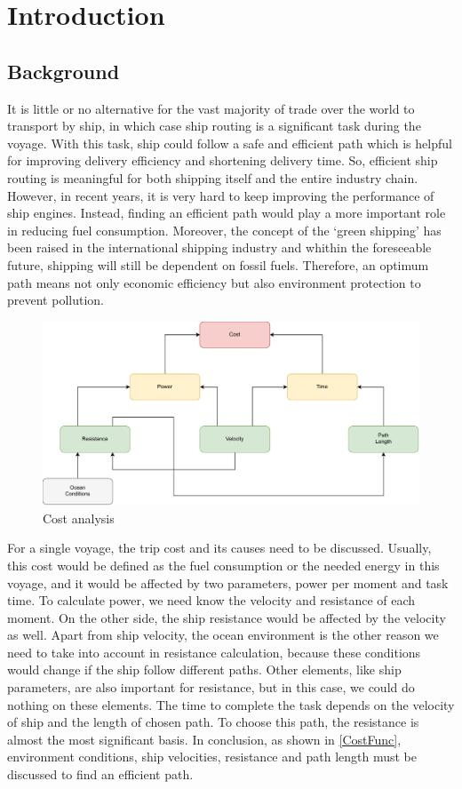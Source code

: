 \chapter{Introduction}
\section{Background}
It is little or no alternative for the vast majority of trade over the world to transport by ship, in which case ship routing is a significant task during the voyage. With this task, ship could follow a safe and efficient path which is helpful for improving delivery efficiency and shortening delivery time. So, efficient ship routing is meaningful for both shipping itself and the entire industry chain.
\\However, in recent years, it is very hard to keep improving the performance of ship engines. Instead, finding an efficient path would play a more important role in reducing fuel consumption. Moreover, the concept of the `green shipping' has been raised in the international shipping industry and whithin the foreseeable future, shipping will still be dependent on fossil fuels. Therefore, an optimum path means not only economic efficiency but also environment protection to prevent pollution.
\begin{figure}[H]  
	\centering  
	\includegraphics[width=0.9\linewidth]{cost function.pdf}  
	\caption{Cost analysis}  
	\label{CostFunc}  
\end{figure}
\noindent For a single voyage, the trip cost and its causes need to be discussed. Usually, this cost would be defined as the fuel consumption or the needed energy in this voyage, and it would be affected by two parameters, power per moment and task time. To calculate power, we need know the velocity and resistance of each moment. On the other side, the ship resistance would be affected by the velocity as well. Apart from ship velocity, the ocean environment is the other reason we need to take into account in resistance calculation, because these conditions would change if the ship follow different paths. Other elements, like ship parameters, are also important for resistance, but in this case, we could do nothing on these elements. The time to complete the task depends on the velocity of ship and the length of chosen path. To choose this path, the resistance is almost the most significant basis. In conclusion, as shown in \autoref{CostFunc}, environment conditions, ship velocities, resistance and path length must be discussed to find an efficient path.

